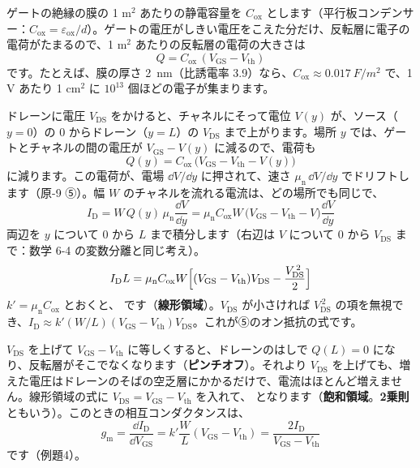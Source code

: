 ゲートの絶縁の膜の 1 m$^2$ あたりの静電容量を $C_{\mathrm{ox}}$ とします（平行板コンデンサー：$C_{\mathrm{ox}}=\varepsilon_{\mathrm{ox}}/d$）。ゲートの電圧がしきい電圧をこえた分だけ、反転層に電子の電荷がたまるので、1 m$^2$ あたりの反転層の電荷の大きさは
\[ Q=C_{\mathrm{ox}}\,(V_{\mathrm{GS}}-V_{\mathrm{th}}) \]
です。たとえば、膜の厚さ \qty{2}{nm}（比誘電率 3.9）なら、$C_{\mathrm{ox}}\approx\qty{0.017}{F/m^2}$ で、1 V あたり 1 cm$^2$ に $10^{13}$ 個ほどの電子が集まります。

ドレーンに電圧 $V_{\mathrm{DS}}$ をかけると、チャネルにそって電位 $V(y)$ が、ソース（$y=0$）の 0 からドレーン（$y=L$）の $V_{\mathrm{DS}}$ まで上がります。場所 $y$ では、ゲートとチャネルの間の電圧が $V_{\mathrm{GS}}-V(y)$ に減るので、電荷も
\[ Q(y)=C_{\mathrm{ox}}\,\bigl(V_{\mathrm{GS}}-V_{\mathrm{th}}-V(y)\bigr) \]
に減ります。この電荷が、電場 $\dd V/\dd y$ に押されて、速さ $\mu_{\mathrm n}\,\dd V/\dd y$ でドリフトします（原-9 ⑤）。幅 $W$ のチャネルを流れる電流は、どの場所でも同じで、
\[ I_{\mathrm D}=W\,Q(y)\,\mu_{\mathrm n}\frac{\dd V}{\dd y}=\mu_{\mathrm n}C_{\mathrm{ox}}W\,\bigl(V_{\mathrm{GS}}-V_{\mathrm{th}}-V\bigr)\frac{\dd V}{\dd y} \]
両辺を $y$ について 0 から $L$ まで積分します（右辺は $V$ について 0 から $V_{\mathrm{DS}}$ まで：数学 6-4 の変数分離と同じ考え）。
\[ I_{\mathrm D}L=\mu_{\mathrm n}C_{\mathrm{ox}}W\Bigl[(V_{\mathrm{GS}}-V_{\mathrm{th}})V_{\mathrm{DS}}-\frac{V_{\mathrm{DS}}^{\,2}}{2}\Bigr] \]
$k'=\mu_{\mathrm n}C_{\mathrm{ox}}$ とおくと、
\label{ph:原-10:linear}です（\textbf{線形領域}）。$V_{\mathrm{DS}}$ が小さければ $V_{\mathrm{DS}}^{\,2}$ の項を無視でき、$I_{\mathrm D}\approx k'(W/L)(V_{\mathrm{GS}}-V_{\mathrm{th}})V_{\mathrm{DS}}$。これが⑤のオン抵抗の式です。

$V_{\mathrm{DS}}$ を上げて $V_{\mathrm{GS}}-V_{\mathrm{th}}$ に等しくすると、ドレーンのはしで $Q(L)=0$ になり、反転層がそこでなくなります（\textbf{ピンチオフ}）。それより $V_{\mathrm{DS}}$ を上げても、増えた電圧はドレーンのそばの空乏層にかかるだけで、電流はほとんど増えません。線形領域の式に $V_{\mathrm{DS}}=V_{\mathrm{GS}}-V_{\mathrm{th}}$ を入れて、
\label{ph:原-10:sat}となります（\textbf{飽和領域}。\textbf{2乗則}ともいう）。このときの相互コンダクタンスは、
\[ g_{\mathrm m}=\frac{\dd I_{\mathrm D}}{\dd V_{\mathrm{GS}}}=k'\frac{W}{L}(V_{\mathrm{GS}}-V_{\mathrm{th}})=\frac{2I_{\mathrm D}}{V_{\mathrm{GS}}-V_{\mathrm{th}}} \]
です（例題4）。

